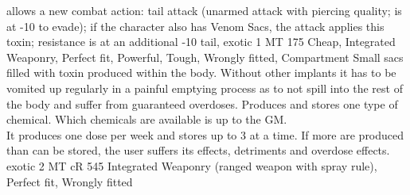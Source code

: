 \documentclass[12pt,a4paper,openany,usenames,dvipsnames]{book}
\begin{document}
\begin{multicols}{2}
        {allows a new combat action: tail attack (unarmed attack with piercing quality; is at -10 to evade); if the character also has Venom Sacs, the attack applies this toxin; resistance is at an additional -10}
        {tail, exotic}
        {1 MT}
        {175}
        {Cheap, Integrated Weaponry, Perfect fit, Powerful, Tough, Wrongly fitted, Compartment}
    	{Small sacs filled with toxin produced within the body.
    		Without other implants it has to be vomited up
    		regularly in a painful emptying process
    		as to not spill into the rest of the body
    		and suffer from guaranteed overdoses.}
    	{Produces and stores one type of chemical.
    		Which chemicals are available is up to the GM.
    		\\%
    		It produces one dose per week and stores up to 3 at a time.
    		If more are produced than can be stored,
    			the user suffers its effects, detriments and overdose effects.}
    	{exotic}
    	{2 MT}
    	{cR 545}
    	{Integrated Weaponry (ranged weapon with spray rule), Perfect fit, Wrongly fitted}
	\end{multicols}
\end{document}
